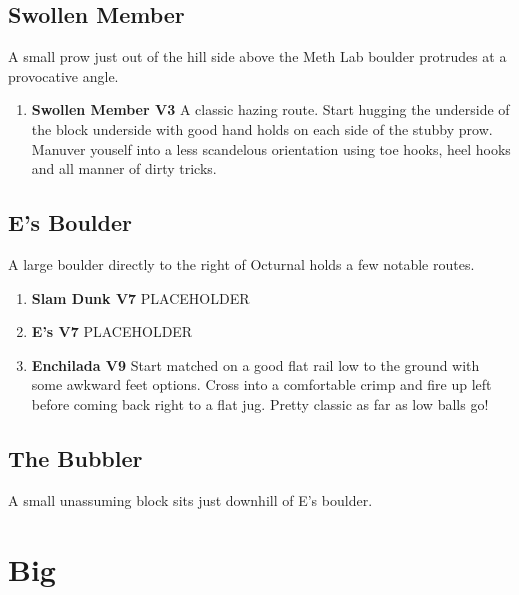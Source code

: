 \subsection*{Swollen Member}\label{bf:Swollen Member}
A small prow just out of the hill side above the Meth Lab boulder protrudes at a provocative angle.

\begin{enumerate}[resume]
	\item\label{rt:Swollen Member} \colorbox{green!20}{\textbf{Swollen Member V3    } }
	\newline A classic hazing route. Start hugging the underside of the block underside with good hand holds on each side of the stubby prow. Manuver youself into a less scandelous orientation using toe hooks, heel hooks and  all manner of dirty tricks.\
\end{enumerate}
\subsection*{E's Boulder}\label{bf:E's Boulder}
A large boulder directly to the right of Octurnal holds a few notable routes.

\begin{enumerate}[resume]
	\item\label{rt:Slam Dunk} \colorbox{Goldenrod!50}{\textbf{Slam Dunk V7  } }
	\newline PLACEHOLDER\
	\item\label{rt:E's} \colorbox{Goldenrod!50}{\textbf{E's V7  } }
	\newline PLACEHOLDER\
	\item\label{rt:Enchilada} \colorbox{Goldenrod!50}{\textbf{Enchilada V9    } }
	\newline Start matched on a good flat rail low to the ground with some awkward feet options. Cross into a comfortable crimp and fire up left before coming back right to a flat jug. Pretty classic as far as low balls go!\
\end{enumerate}
\subsection*{The Bubbler}\label{bf:The Bubbler}
A small unassuming block sits just downhill of E's boulder.

\section{Big}\label{sa:Big}
\
